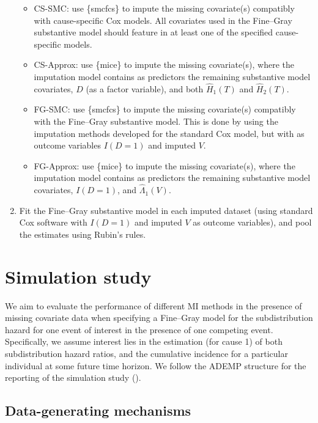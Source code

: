 \documentclass[
  letterpaper,
  paper=240mm:170mm,
  twoside=true,
  open=right,
  fontsize=10pt,
  pagesize=false,
  BCOR=15mm,
  DIV=14,
  headinclude=true,
  footinclude=false,
  headsepline=on]{scrbook}
\providecommand{\tightlist}{%
  \setlength{\itemsep}{0pt}\setlength{\parskip}{0pt}}\usepackage{longtable,booktabs,array}
\begin{document}
\begin{enumerate}
  \begin{itemize}
  \tightlist
  \item
    CS-SMC: use \{smcfcs\} to impute the missing covariate(s) compatibly
    with cause-specific Cox models. All covariates used in the
    Fine--Gray substantive model should feature in at least one of the
    specified cause-specific models.
  \item
    CS-Approx: use \{mice\} to impute the missing covariate(s), where
    the imputation model contains as predictors the remaining
    substantive model covariates, \(D\) (as a factor variable), and both
    \(\hat{H}_1(T)\) and \(\hat{H}_2(T)\).
  \item
    FG-SMC: use \{smcfcs\} to impute the missing covariate(s) compatibly
    with the Fine--Gray substantive model. This is done by using the
    imputation methods developed for the standard Cox model, but with as
    outcome variables \(I(D = 1)\) and imputed \(V\).
  \item
    FG-Approx: use \{mice\} to impute the missing covariate(s), where
    the imputation model contains as predictors the remaining
    substantive model covariates, \(I(D = 1)\), and
    \(\hat{\Lambda}_1(V)\).
  \end{itemize}
\item
  Fit the Fine--Gray substantive model in each imputed dataset (using
  standard Cox software with \(I(D = 1)\) and imputed \(V\) as outcome
  variables), and pool the estimates using Rubin's rules.
\end{enumerate}

\section{Simulation study}\label{sec-sim-study}

We aim to evaluate the performance of different MI methods in the
presence of missing covariate data when specifying a Fine--Gray model
for the subdistribution hazard for one event of interest in the presence
of one competing event. Specifically, we assume interest lies in the
estimation (for cause 1) of both subdistribution hazard ratios, and the
cumulative incidence for a particular individual at some future time
horizon. We follow the ADEMP structure for the reporting of the
simulation study ().

\subsection{Data-generating
mechanisms}\label{data-generating-mechanisms-1}
\end{document}
